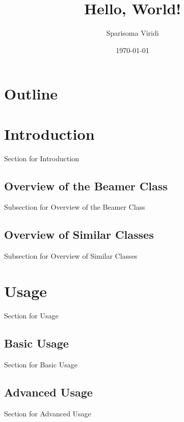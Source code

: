 \documentclass{beamer}
\title{Hello, World!}
\author{Sparisoma Viridi}
\date{\today}
\institute{Asosiasi Ilmuwan Data Indonesia}
\begin{document}
\begin{frame}
\titlepage
\end{frame}

\section*{Outline}

\begin{frame}
\tableofcontents
\end{frame}

\section{Introduction}
\begin{frame}
Section for Introduction
\end{frame}

\subsection{Overview of the Beamer Class}
\begin{frame}
Subsection for Overview of the Beamer Class
\end{frame}

\subsection{Overview of Similar Classes}
\begin{frame}
Subsection for Overview of Similar Classes
\end{frame}


\section{Usage}
\begin{frame}
Section for Usage
\end{frame}

\subsection{Basic Usage}
\begin{frame}
Section for Basic Usage
\end{frame}

\subsection{Advanced Usage}
\begin{frame}
Section for Advanced Usage
\end{frame}
\end{document}
